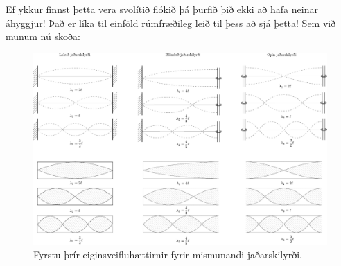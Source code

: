 Ef ykkur finnst þetta vera svolítið flókið þá þurfið þið ekki að hafa neinar áhyggjur! Það er líka til einföld rúmfræðileg leið til þess að sjá þetta! Sem við munum nú skoða:

\begin{figure}[H]
    \centering
    \includegraphics[width = \textwidth]{figures/neumann-stadbylgjurs.pdf}
    \caption{Fyrstu þrír eiginsveifluhættirnir fyrir mismunandi jaðarskilyrði.}
    \label{fig:eiginsveiflur}
\end{figure}

